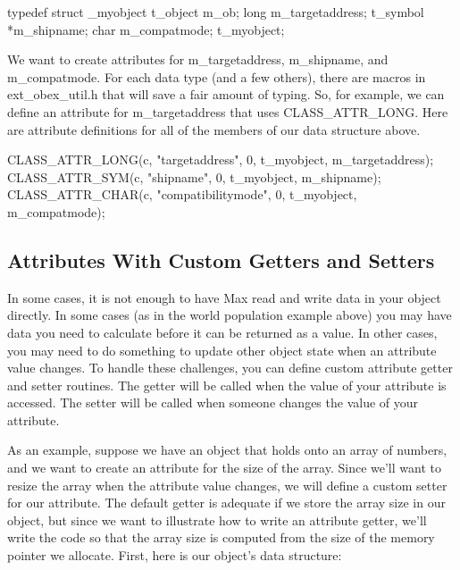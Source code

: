 \begin{DoxyCode}
    typedef struct _myobject {
        t_object m_ob;
        long m_targetaddress;
        t_symbol *m_shipname;
        char m_compatmode;
    } t_myobject;
\end{DoxyCode}


We want to create attributes for m\_\-targetaddress, m\_\-shipname, and m\_\-compatmode. For each data type (and a few others), there are macros in ext\_\-obex\_\-util.h that will save a fair amount of typing. So, for example, we can define an attribute for m\_\-targetaddress that uses CLASS\_\-ATTR\_\-LONG. Here are attribute definitions for all of the members of our data structure above.


\begin{DoxyCode}
    CLASS_ATTR_LONG(c, "targetaddress", 0, t_myobject, m_targetaddress);
    CLASS_ATTR_SYM(c, "shipname", 0, t_myobject, m_shipname);
    CLASS_ATTR_CHAR(c, "compatibilitymode", 0, t_myobject, m_compatmode);
\end{DoxyCode}
\hypertarget{chapter_msgattached_chapter_msgattached_attr_custom}{}\subsection{Attributes With Custom Getters and Setters}\label{chapter_msgattached_chapter_msgattached_attr_custom}
In some cases, it is not enough to have Max read and write data in your object directly. In some cases (as in the world population example above) you may have data you need to calculate before it can be returned as a value. In other cases, you may need to do something to update other object state when an attribute value changes. To handle these challenges, you can define custom attribute getter and setter routines. The getter will be called when the value of your attribute is accessed. The setter will be called when someone changes the value of your attribute.

As an example, suppose we have an object that holds onto an array of numbers, and we want to create an attribute for the size of the array. Since we'll want to resize the array when the attribute value changes, we will define a custom setter for our attribute. The default getter is adequate if we store the array size in our object, but since we want to illustrate how to write an attribute getter, we'll write the code so that the array size is computed from the size of the memory pointer we allocate. First, here is our object's data structure:


